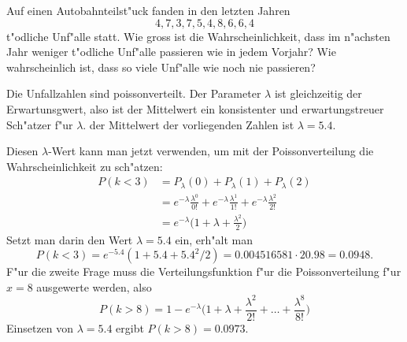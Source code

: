 Auf einen Autobahnteilst"uck fanden in den letzten Jahren
\[
4, 7, 3, 7, 5, 4, 8, 6, 6, 4
\]
t"odliche Unf"alle statt.
Wie gross ist die Wahrscheinlichkeit, dass im n"achsten Jahr
weniger t"odliche Unf"alle passieren wie in jedem Vorjahr?
Wie wahrscheinlich ist, dass so viele Unf"alle wie noch nie
passieren?

\begin{loesung}
Die Unfallzahlen sind poissonverteilt.
Der Parameter $\lambda$ ist gleichzeitig der Erwartunsgwert, also
ist der Mittelwert ein konsistenter und erwartungstreuer Sch"atzer
f"ur $\lambda$. der Mittelwert der vorliegenden Zahlen ist $\lambda=5.4$.

Diesen $\lambda$-Wert kann man jetzt verwenden, um mit der Poissonverteilung
die Wahrscheinlichkeit zu sch"atzen:
\begin{align*}
P(k<3)&=
P_\lambda(0)
+
P_\lambda(1)
+
P_\lambda(2)
\\
&=
e^{-\lambda}\frac{\lambda^0}{0!}
+
e^{-\lambda}\frac{\lambda^1}{1!}
+
e^{-\lambda}\frac{\lambda^2}{2!}
\\
&=
e^{-\lambda}\biggl(1+\lambda+\frac{\lambda^2}{2}\biggr)
\end{align*}
Setzt man darin den Wert $\lambda=5.4$ ein, erh"alt man
\[
P(k<3)=e^{-5.4}(1+5.4+5.4^2/2)=0.004516581\cdot 20.98= 0.0948.
\]
F"ur die zweite Frage muss die Verteilungsfunktion f"ur die
Poissonverteilung f"ur $x=8$ ausgewerte werden, also
\[
P(k>8)=
1-e^{-\lambda}\biggl(
1+\lambda+\frac{\lambda^2}{2!}+\dots+\frac{\lambda^8}{8!}
\biggr)
\]
Einsetzen von $\lambda=5.4$ ergibt $P(k>8)=0.0973$.
\end{loesung}

